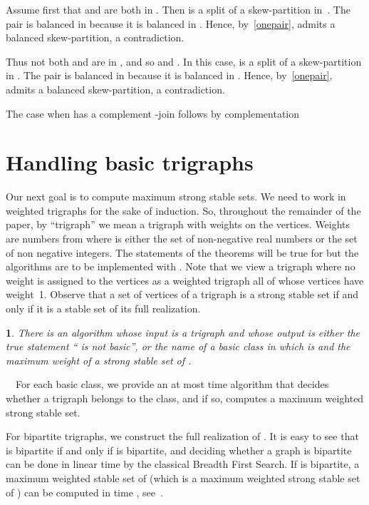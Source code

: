 \documentclass[11 pt] {article}
\newcommand\blackslug{\hbox{\hskip 1pt \vrule width 4pt height 8pt depth 1.5pt
        \hskip 1pt}}
\newcommand\bbox{\hfill \quad \blackslug \medbreak}
\newtheorem{theorem}{}[section]
\newcounter{claim}
\newcommand{\Proof}{\setcounter{claim}{0}\noindent{\bf Proof.}\ \ }
\begin{document}
Assume first that  and  are both in . Then  is a split of a skew-partition  in~.  The pair  is
balanced in  because it is balanced in .  Hence,
by~\ref{onepair},  admits a balanced skew-partition, a
contradiction.  


Thus not both  and  are in , and so  and . In this case,  is a split of a skew-partition  in .  The pair  is
balanced in  because it is balanced in .  Hence,
by~\ref{onepair},  admits a balanced skew-partition, a
contradiction.   

The case when  has a complement -join follows by complementation
\bbox

\section{Handling basic trigraphs}
\label{sec:bas}

Our next goal is to compute maximum strong stable sets.  We need to
work in weighted trigraphs for the sake of induction. So, throughout
the remainder of the paper, by ``trigraph'' we mean a trigraph with
weights on the vertices.  Weights are numbers from  where  is
either the set  of non-negative real numbers or the set
 of non negative integers.  The statements of the
theorems will be true for  but the algorithms are to
be implemented with . Note that we view a trigraph
where no weight is assigned to the vertices as a weighted trigraph all
of whose vertices have weight~1.  Observe that a set of vertices of a
trigraph is a strong stable set if and only if it is a stable set of
its full realization.



\begin{theorem}
  \label{th:decBas}
  There is an  algorithm whose input is a trigraph and whose
  output is either the true statement `` is not basic'', or the
  name of a basic class in which  is and the maximum weight of a
  strong stable set of .
\end{theorem}

\Proof For each basic class, we provide an at most  time
algorithm that decides whether a trigraph  belongs to the class,
and if so, computes a maximum weighted strong stable set.

For bipartite trigraphs, we construct the full realization  of .
It is easy to see that  is bipartite if and only if  is
bipartite, and deciding whether a graph is bipartite can be done in
linear time by the classical Breadth First Search.  If  is
bipartite, a maximum weighted stable set of  (which is a maximum
weighted strong stable set of ) can be computed in time ,
see~\cite{schrijver:opticomb}.
\end{document}
